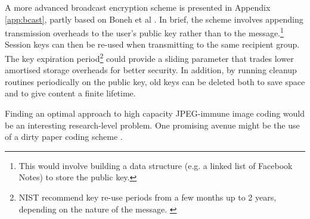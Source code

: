 A more advanced broadcast encryption scheme is presented in Appendix \ref{app:bcast}, partly based on Boneh et al \cite{boneh}. In brief, the scheme involves appending transmission overheads to the user's public key rather than to the message.\footnote{This would involve building a data structure (e.g. a linked list of Facebook Notes) to store the public key.} Session keys can then be re-used when transmitting to the same recipient group. The key expiration period\footnote{NIST recommend key re-use periods from a few months up to 2 years, depending on the nature of the message. \cite{nist-key}} could provide a sliding parameter that trades lower amortised storage overheads for better security. In addition, by running cleanup routines periodically on the public key, old keys can be deleted both to save space and to give content a finite lifetime.

Finding an optimal approach to high capacity JPEG-immune image coding would be an interesting research-level problem. One promising avenue might be the use of a dirty paper coding scheme \cite{dpaper}.








